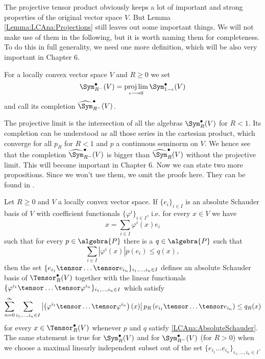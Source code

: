 The projective tensor product obviously keeps a lot of important and 
strong properties of the original vector space $V$. But Lemma 
\ref{Lemma:LCAna:Projections} still leaves out some important things. 
We will not make use of them in the following, but it is worth naming 
them for completeness. To do this in full generality, we 
need one more definition, which will be also very important in Chapter 6.
\begin{definition}\label{ProjectiveLimit}
	For a locally convex vector space $V$ and $R \geq 0$ we set
	\begin{equation*}
		\Sym_{R^-}^{\bullet}(V)
		=
		\projlim\limits_{\epsilon \longrightarrow 0}
		\Sym_{1 - \epsilon}^{\bullet}(V)
	\end{equation*}
	and call its completion $\widehat{\Sym}_{R^-}^{\bullet}(V)$.
\end{definition}
The projective limit is the intersection of all the algebras 
$\Sym_R^{\bullet}(V)$ for $R < 1$. Its completion can be understood as all 
those series in the cartesian product, which converge for all $p_R$ for $R < 1$ 
and $p$ a continuous seminorm on $V$. We hence see that the completion 
$\widehat{\Sym}_{R^-}^{\bullet}(V)$ is bigger than $\widehat{\Sym}_R^{\bullet}
(V)$ without the projective limit. This will become important in Chapter 6.
Now we can state two more propositions. Since we won't use them, we omit the 
proofs here. They can be found in \cite{waldmann:2014a}.
\begin{proposition}
	\label{Prop:LCAna:Bases}
	Let $R \geq 0$ and $V$ a locally convex vector space.
	If $\{e_i\}_{i \in I}$ is an absolute Schauder basis of $V$ with 
	coefficient functionals $\{\varphi^i\}_{i \in I}$, i.e. for every 
	$x \in V$ we have
	\begin{equation*}
		x
		=
		\sum\limits_{i \in I}
		\varphi^i(x) e_i
	\end{equation*}
	such that for every $p \in \algebra{P}$ there is a 
	$q \in \algebra{P}$ such that
	\begin{equation}
		\label{LCAna:AbsoluteSchauder}
		\sum\limits_{i \in I}
		|\varphi^i(x)|
		p(e_i)
		\leq
		q(x),
	\end{equation}
	then the set 
	$\{e_{i_1} \tensor \ldots \tensor e_{i_n}\}_{i_1, \ldots, i_n \in I}$ 
	defines an absolute Schauder basis of $\Tensor_R^{\bullet}(V)$ 
	together with the linear functionals $\{\varphi^{i_1} \tensor \ldots 
	\tensor 	\varphi^{i_n}\}_{i_1, \ldots, i_n \in I}$ which satisfy
	\begin{equation*}
		\sum\limits_{n=0}^{\infty}
		\sum\limits_{i_1, \ldots, i_n \in I}
		\left| 
			\left(
				\varphi^{i_1} \tensor \ldots \tensor \varphi^{i_n}
			\right)
			(x)
		\right|
		p_R \left(
			e_{i_1} \tensor \ldots \tensor e_{i_n}
		\right)
		\leq
		q_R (x)
	\end{equation*}
	for every $x \in \Tensor_R^{\bullet}(V)$ whenever $p$ and $q$ satisfy 
	\eqref{LCAna:AbsoluteSchauder}. The same statement is true for 
	$\Sym_R^{\bullet}(V)$ and for $\Sym_{R^-}^{\bullet}(V)$ (for $R > 0$) when 
	we choose a maximal linearly independent subset out of the set $\{e_{i_1} 
	\ldots e_{i_n}\}_{i_1, \ldots, i_n \in I}$.
\end{proposition}

